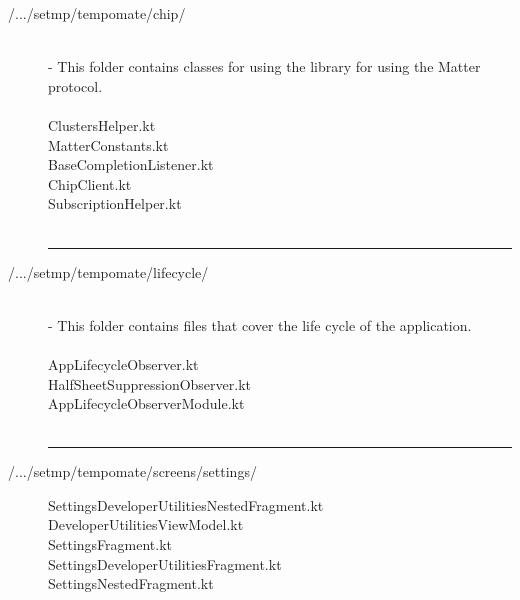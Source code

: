 \begin{enumerate}[label=\alph*]
\begin{description}
              \item[/.../setmp/tempomate/chip/] \hfill \\
                    \small
                    - This folder contains classes for using the library for using the Matter protocol.\\\\
                    \footnotesize
                    ClustersHelper.kt  \\
                    MatterConstants.kt  \\
                    BaseCompletionListener.kt  \\
                    ChipClient.kt  \\
                    SubscriptionHelper.kt  \\\\

                    \vspace{-0.2cm}
                    \hrule
                    \vspace{0.2cm}

              \item[/.../setmp/tempomate/lifecycle/] \hfill \\
                    \small
                    - This folder contains files that cover the life cycle of the application.\\\\
                    \footnotesize
                    AppLifecycleObserver.kt  \\
                    HalfSheetSuppressionObserver.kt  \\
                    AppLifecycleObserverModule.kt  \\\\

                    \vspace{-0.2cm}
                    \hrule
                    \vspace{0.2cm}

              \item[/.../setmp/tempomate/screens/settings/] \hfill
                    \footnotesize
                    SettingsDeveloperUtilitiesNestedFragment.kt  \\
                    DeveloperUtilitiesViewModel.kt  \\
                    SettingsFragment.kt  \\
                    SettingsDeveloperUtilitiesFragment.kt  \\
                    SettingsNestedFragment.kt  \\\\


\end{description}
\end{enumerate}
